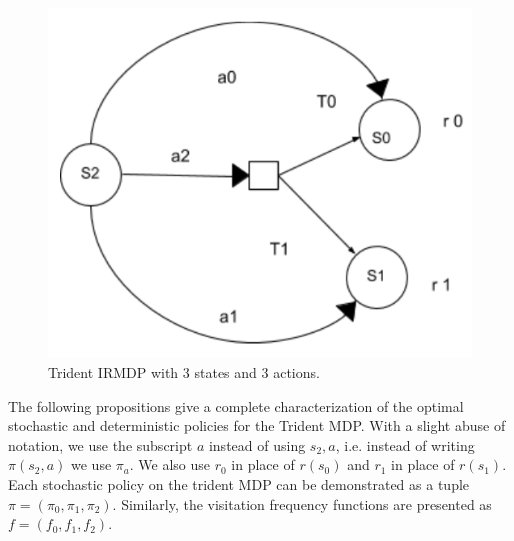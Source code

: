 \begin{figure}[]
	\begin{center}
    \includegraphics[scale=0.4]{images/Trident_MDP.pdf}
	\end{center}
	\caption{Trident IRMDP with $3$ states and $3$ actions.}
	\label{fig:trident} 
\end{figure}

The following propositions give a complete characterization of the optimal stochastic and deterministic policies for the Trident MDP. With a slight abuse of notation, we use the subscript $a$ instead of using $s_2,a$, i.e. instead of writing $\pi(s_2, a)$ we use $\pi_a$. 
We also use $r_{0}$ in place of $r(s_0)$ and $r_{1}$ in place of $r(s_1)$. Each stochastic policy on the trident MDP can be demonstrated as a tuple $\pi = (\pi_0, \pi_1, \pi_2)$. %
Similarly, the visitation frequency functions are presented as $f = (f_0, f_1, f_2)$.

